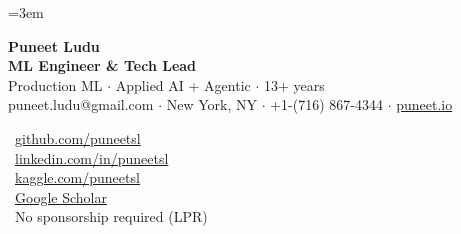 \documentclass[11pt,letterpaper]{article}
\newcommand{\tinyfootnote}{\fontsize{8.7pt}{10.4pt}\selectfont}
\begin{document}
\emergencystretch=3em

\begin{tcolorbox}[resumecard,breakable=false,before skip=0pt,top=7pt,bottom=7pt]
\begin{minipage}[t]{0.62\linewidth}
    \vspace{0pt}
    \fontsize{26pt}{30pt}\selectfont\textbf{\color{namecolor}Puneet Ludu}\\[3pt]
    {\normalsize\bfseries\color{accentcolor}ML Engineer \& Tech Lead}\\[1pt]
    {\small\color{taglinecolor}Production ML $\cdot$ Applied AI + Agentic $\cdot$ 13+ years}\\[3pt]
    \footnotesize puneet.ludu@gmail.com $\cdot$ New York, NY $\cdot$ +1-(716) 867-4344 $\cdot$ \href{https://puneet.io}{puneet.io}
\end{minipage}%
\begin{minipage}[t]{0.38\linewidth}
    \vspace{6pt}
    \raggedleft
    \begin{minipage}[t]{147pt}
    \raggedright\footnotesize
    \makebox[12pt][c]{\color{accentcolor}\faGithub}~\href{https://github.com/puneetsl}{github.com/puneetsl}\\[1pt]
    \makebox[12pt][c]{\color{accentcolor}\faLinkedin}~\href{https://www.linkedin.com/in/puneetsl}{linkedin.com/in/puneetsl}\\[1pt]
    \makebox[12pt][c]{\color{accentcolor}\faKaggle}~\href{https://www.kaggle.com/puneetsl}{kaggle.com/puneetsl}\\[1pt]
    \makebox[12pt][c]{\color{accentcolor}\faGraduationCap}~\href{https://scholar.google.com/citations?user=NrYKcaMAAAAJ\&hl=en}{Google Scholar}
    \\[1pt]
    {\color{taglinecolor}\makebox[12pt][c]{\faIdCard}~{\tinyfootnote No sponsorship required (LPR)}}
    \end{minipage}
\end{minipage}

\end{tcolorbox}
\end{document}
